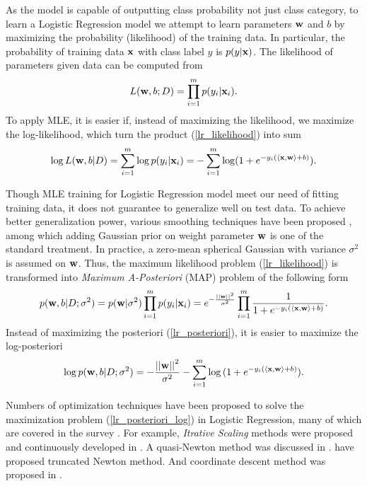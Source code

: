 {%
As the model is capable of outputting class probability not just class category, to learn a Logistic Regression model we attempt to learn parameters $\mathbf {w}$ and $b$ by maximizing the probability (likelihood) of the training data.
In particular, the probability of training data $\mathbf {x}$ with class label $y$ is $p(y|\mathbf {x})$.
The likelihood of parameters given data can be computed from
\begin{align}
	L(\mathbf {w},b;D) = \prod_{i=1}^mp(y_i|\mathbf {x}_i). \label{lr_likelihood}
\end{align}
To apply MLE, it is easier if, instead of maximizing the likelihood, we maximize the log-likelihood, which turn the product (\ref{lr_likelihood}) into sum
\begin{align}
	\log L(\mathbf {w},b|D) = \sum_{i=1}^{m}\log p(y_i|\mathbf {x}_i) = -\sum_{i=1}^{m}\log (1+e^{ -y_i(\langle \mathbf {x}, \mathbf {w} \rangle+b) }) \label{lr_likelihood_sum}.
\end{align}

Though MLE training for Logistic Regression model meet our need of fitting training data, it does not guarantee to generalize well on test data.
To achieve better generalization power, various smoothing techniques have been proposed \citep{Chen99,Chen00,Goodman03}, among which adding Gaussian prior on weight parameter $\mathbf {w}$ is one of the standard treatment.
In practice, a zero-mean spherical Gaussian with variance $\sigma^2$ is assumed on $\mathbf {w}$.
Thus, the maximum likelihood problem (\ref{lr_likelihood}) is transformed into \textit{Maximum A-Posteriori} (MAP) problem of the following form
\begin{align}
	p(\mathbf {w},b|D;\sigma^2) = p(\mathbf {w}|\sigma^2)\prod_{i=1}^mp(y_i|\mathbf {x}_i)=e^{ -\frac{\left|\left| \mathbf {w} \right|\right|^2}{\sigma^2} }\prod_{i=1}^{m}{\frac{1}{1+e^{ -y_i(\langle \mathbf {x}, \mathbf {w} \rangle+b) }}}. \label{lr_posteriori}
\end{align}
Instead of maximizing the posteriori (\ref{lr_posteriori}), it is easier to maximize the log-posteriori
\begin{align}
	\log p(\mathbf {w},b|D;\sigma^2) = -{\frac{\left|\left| \mathbf {w} \right|\right|^2}{\sigma^2}} - \sum_{i=1}^{m}\log{(1+e^{ -y_i(\langle \mathbf {x}, \mathbf {w}\rangle+b) })}. \label{lr_posteriori_log}
\end{align}

Numbers of optimization techniques have been proposed to solve the maximization problem (\ref{lr_posteriori_log}) in Logistic Regression, many of which are covered in the survey \citep{Minka03}.
For example, \textit{Itrative Scaling} methods were proposed and continuously developed in \citep{Darroch72,Pietra97inducing,Berger97,Goodman02Sequential,Jin03a}.
A quasi-Newton method was discussed in \citep{Minka03}.
\citet{Komarek05making,Lin2008trust} have proposed truncated Newton method.
And coordinate descent method was proposed in \citep{Huang09iterative}.

}
